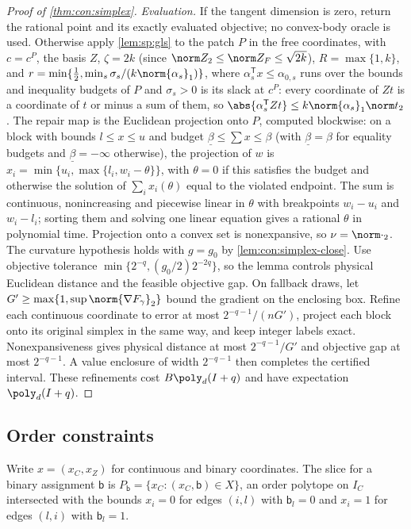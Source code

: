 \begin{proof}[Proof of \cref{thm:con:simplex}]
\emph{Evaluation.} If the tangent dimension is zero, return the rational
point and its exactly evaluated objective; no convex-body oracle is used.
Otherwise apply \cref{lem:sp:gls} to the patch $P$ in the free
coordinates, with $c=c^P$, the basis $Z$, $\zeta=2k$ (since
$\norm Z_2\le\norm Z_F\le\sqrt{2k}$), $R=\max\{1,k\}$, and
$r=\min\{\frac12,\min_s\sigma_s/(k\norm{\alpha_s}_1)\}$, where $\alpha_s^{\mathsf
T}x\le\alpha_{0,s}$ runs over the bounds and inequality budgets of $P$ and
$\sigma_s>0$ is its slack at $c^P$: every coordinate of $Zt$ is a coordinate of
$t$ or minus a sum of them, so $\abs{\alpha_s^{\mathsf T}Zt}\le
k\norm{\alpha_s}_1\norm t_2$. The repair map is the Euclidean projection onto
$P$, computed blockwise: on a block with bounds $l\le x\le u$ and budget
$\underline\beta\le\sum x\le\beta$ (with $\underline\beta=\beta$ for equality
budgets and $\underline\beta=-\infty$ otherwise), the projection of $w$ is
$x_i=\min\{u_i,\max\{l_i,w_i-\theta\}\}$, with $\theta=0$ if this satisfies
the budget and otherwise the solution of $\sum_ix_i(\theta)$ equal to the
violated endpoint. The sum is continuous, nonincreasing and piecewise linear
in $\theta$ with breakpoints $w_i-u_i$ and $w_i-l_i$; sorting them and solving
one linear equation gives a rational $\theta$ in polynomial time. Projection
onto a convex set is nonexpansive, so $\nu=\norm\cdot_2$. The curvature
hypothesis holds with $g=g_0$ by \cref{lem:con:simplex-close}. Use objective
tolerance $\min\{2^{-q},(g_0/2)2^{-2q}\}$, so the lemma controls physical
Euclidean distance and the feasible objective gap. On fallback draws, let
$G'\ge\max\{1,\sup\norm{\nabla F_\gamma}_2\}$ bound the gradient on the
enclosing box. Refine each continuous coordinate to error at most
$2^{-q-1}/(nG')$, project each block onto its original simplex in the same
way, and keep integer labels exact. Nonexpansiveness gives physical distance
at most $2^{-q-1}/G'$ and objective gap at most $2^{-q-1}$. A value enclosure
of width $2^{-q-1}$ then completes the certified interval. These refinements
cost $B\poly_d(I+q)$ and have expectation $\poly_d(I+q)$.
\end{proof}

\subsection{Order constraints}\label{app:con:order}

Write $x=(x_C,x_Z)$ for continuous and binary coordinates. The slice for a
binary assignment $\mathsf b$ is
$P_{\mathsf b}=\{x_C:(x_C,\mathsf b)\in X\}$, an order polytope on $I_C$
intersected with the bounds $x_i=0$ for edges $(i,l)$ with $\mathsf b_l=0$ and
$x_i=1$ for edges $(l,i)$ with $\mathsf b_l=1$.

